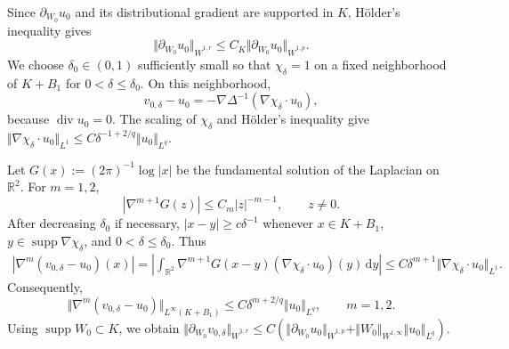 \documentclass[reqno,11pt,a4paper]{amsart}
\newcommand{\dd}{\mathrm{d}}
\begin{document}
Since $\partial_{W_0}u_0$ and its distributional gradient
are supported in $K$, H\"older's inequality gives
\[
  \Vert \partial_{W_0}u_0\Vert _{\dot W^{1,r}}
  \leq C_K
  \Vert \partial_{W_0}u_0\Vert _{\dot W^{1,p}}.
\]
We choose $\delta_0\in(0,1)$ sufficiently small
so that $\chi_\delta=1$ on a fixed neighborhood
of $K+B_1$ for $0<\delta\leq\delta_0$.
On this neighborhood,
\[
  v_{0,\delta}-u_0
  =
  -\nabla\Delta^{-1}
  (\nabla\chi_\delta\cdot u_0),
\]
because $\operatorname{div}u_0=0$.
The scaling of $\chi_\delta$ and H\"older's inequality give $\Vert \nabla\chi_\delta\cdot u_0\Vert _{L^1}
  \leq
  C\delta^{-1+2/q}\Vert u_0\Vert _{L^q}$. 

Let $G(x):=(2\pi)^{-1}\log|x|$ be the fundamental
solution of the Laplacian on $\mathbb R^2$.
For $m=1,2$,
\[
  |\nabla^{m+1}G(z)|
  \leq C_m|z|^{-m-1},
  \qquad z\neq0.
\]
After decreasing $\delta_0$ if necessary, $|x-y|\geq c\delta^{-1}$ 
whenever $x\in K+B_1$,
$y\in\operatorname{supp}\nabla\chi_\delta$,
and $0<\delta\leq\delta_0$.
Thus
\begin{align*}
  |\nabla^m(v_{0,\delta}-u_0)(x)|
  =
  \left|
    \int_{\mathbb R^2}
    \nabla^{m+1}G(x-y)
    (\nabla\chi_\delta\cdot u_0)(y)\,\dd y
  \right|
  \leq
  C\delta^{m+1}
  \Vert \nabla\chi_\delta\cdot u_0\Vert _{L^1}.
\end{align*}
Consequently,
\begin{equation}\label{eq:far-field}
  \Vert \nabla^m(v_{0,\delta}-u_0)
    \Vert _{L^\infty(K+B_1)}
  \leq
  C\delta^{m+2/q}\Vert u_0\Vert _{L^q},
  \qquad m=1,2.
\end{equation}
Using $\operatorname{supp}W_0\subset K$, we obtain $\Vert \partial_{W_0}v_{0,\delta}\Vert _{\dot W^{1,r}}
  \leq
  C\left(
    \Vert \partial_{W_0}u_0\Vert _{\dot W^{1,p}}
    +
    \Vert W_0\Vert _{W^{1,\infty}}\Vert u_0\Vert _{L^q}
  \right)$. 
\end{document}
